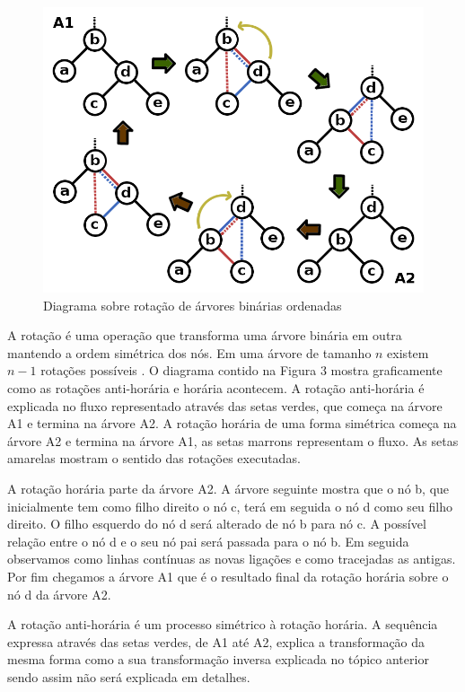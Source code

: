 \begin{figure}[H]
	\caption{\label{gram_cls}Diagrama sobre rotação de árvores binárias ordenadas}
	\begin{center}
	    \includegraphics[scale=0.25]{tree_rotations.png}
	\end{center}
\end{figure}

A rotação é uma operação que transforma uma árvore binária em outra mantendo a ordem simétrica dos nós. Em uma árvore de tamanho $n$ existem $n-1$ rotações possíveis \cite{binTree}. O diagrama contido na Figura 3 mostra graficamente como as rotações anti-horária e horária acontecem. A rotação anti-horária é explicada no fluxo representado através das setas verdes, que começa na árvore A1 e termina na árvore A2. A rotação horária de uma forma simétrica começa na árvore A2 e termina na árvore A1, as setas marrons representam o fluxo. As setas amarelas mostram o sentido das rotações executadas.

A rotação horária parte da árvore A2. A árvore seguinte mostra que o nó b, que inicialmente tem como filho direito o nó c, terá em seguida o nó d como seu filho direito. O filho esquerdo do nó d será alterado de nó b para nó c. A possível relação entre o nó d e o seu nó pai será passada para o nó b. Em seguida observamos como linhas contínuas as novas ligações e como tracejadas as antigas. Por fim chegamos a árvore A1 que é o resultado final da rotação horária sobre o nó d da árvore A2.

A rotação anti-horária é um processo simétrico à rotação horária. A sequência expressa através das setas verdes, de A1 até A2, explica a transformação da mesma forma como a sua transformação inversa explicada no tópico anterior sendo assim não será explicada em detalhes.

